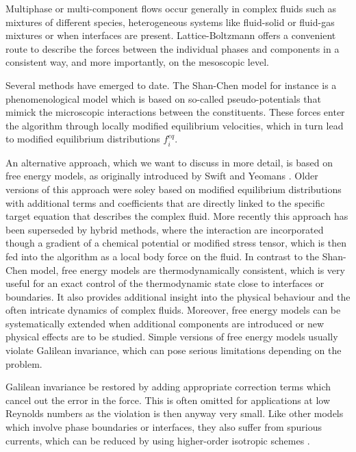 \documentclass[8.5pt,twoside,twocolumn]{article}
\begin{document}
Multiphase or multi-component flows occur generally in complex fluids such as 
mixtures of different species, heterogeneous systems like fluid-solid or fluid-gas mixtures 
or when interfaces are present. 
Lattice-Boltzmann offers a convenient route to describe the forces  
between the individual phases and components in a consistent way, and more importantly, on the mesoscopic level. 

Several methods have emerged to date. The Shan-Chen model \cite{Shan:1993} for instance is a 
phenomenological model which is based on so-called pseudo-potentials that mimick the microscopic 
interactions between the constituents. These forces enter the algorithm through locally modified equilibrium
velocities, which in turn lead to modified equilibrium distributions $f_i^{eq}$.

An alternative approach, which we want to discuss in more detail, is based on free energy models,
as originally introduced by Swift and Yeomans \cite{Swift:1995, Swift:1996}.
Older versions of this approach were soley based on modified equilibrium distributions with
additional terms and coefficients that are directly linked to the specific target equation that 
describes the complex fluid.
More recently this approach has been superseded by hybrid methods, where the interaction 
are incorporated though a gradient of a chemical potential or modified stress tensor,
which is then fed into the algorithm as a local body force on the fluid. 
In contrast to the Shan-Chen model, free energy models are thermodynamically consistent, 
which is very useful for an exact control of the thermodynamic
state close to interfaces or boundaries. It also provides additional insight into the physical behaviour and the 
often intricate dynamics of complex fluids.
Moreover, free energy models can be systematically extended when additional components are 
introduced or new physical effects are to be studied.
Simple versions of free energy models usually violate Galilean invariance, which can pose 
serious limitations depending on the problem. 

Galilean invariance be restored by adding appropriate correction terms which cancel out the
error in the force. This is often omitted for applications at low Reynolds numbers as the violation 
is then anyway very small.  
Like other models which involve phase boundaries or interfaces, they also suffer from spurious 
currents, which can be reduced by using higher-order isotropic schemes \cite{Connington:2012}.
\end{document}
